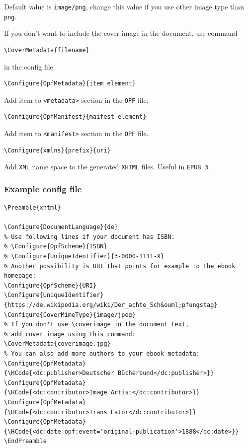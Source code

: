 Default value is \texttt{image/png}, change this value if you use other
image type than \texttt{png}.

If you don't want to include the cover image in the document, use
command

\begin{verbatim}
\CoverMetadata{filename}
\end{verbatim}

in the config file.

\begin{verbatim}
\Configure{OpfMetadata}{item element}
\end{verbatim}

Add item to \texttt{\textless{}metadata\textgreater{}} section in the
\texttt{OPF} file.

\begin{verbatim}
\Configure{OpfManifest}{maifest element}
\end{verbatim}

Add item to \texttt{\textless{}manifest\textgreater{}} section in the
\texttt{OPF} file.

\begin{verbatim}
\Configure{xmlns}{prefix}{uri}
\end{verbatim}

Add \texttt{XML} name space to the generated \texttt{XHTML} files.
Useful in \texttt{EPUB\ 3}.

\subsubsection{Example config file}\label{example-config-file}

\begin{verbatim}
\Preamble{xhtml}

\Configure{DocumentLanguage}{de}
% Use following lines if your document has ISBN:
% \Configure{OpfScheme}{ISBN}
% \Configure{UniqueIdentifier}{3-0000-1111-X}
% Another possibility is URI that points for example to the ebook homepage:
\Configure{OpfScheme}{URI}
\Configure{UniqueIdentifier}
{https://de.wikipedia.org/wiki/Der_achte_Sch&ouml;pfungstag}
\Configure{CoverMimeType}{image/jpeg}
% If you don't use \coverimage in the document text, 
% add cover image using this command:
\CoverMetadata{coverimage.jpg}
% You can also add more authors to your ebook metadata:
\Configure{OpfMetadata}
{\HCode{<dc:publisher>Deutscher Bücherbund</dc:publisher>}}
\Configure{OpfMetadata}
{\HCode{<dc:contributor>Image Artist</dc:contributor>}}
\Configure{OpfMetadata}
{\HCode{<dc:contributor>Trans Lator</dc:contributor>}}
\Configure{OpfMetadata}
{\HCode{<dc:date opf:event='original-publication'>1888</dc:date>}}
\EndPreamble
\end{verbatim}


